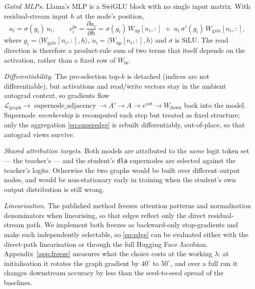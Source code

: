 \documentclass{article}
\DeclareMathOperator{\snadj}{supernode\_adjacency}
\begin{document}
\emph{Gated MLPs.} Llama's MLP is a SwiGLU block \citep{shazeer2020glu} with no single input matrix.
With residual-stream input $h$ at the node's position,
\begin{equation}
  a_i = \sigma(g_i)\, u_i, \qquad
  v^{\mathrm{in}}_i = \frac{\partial a_i}{\partial h}
    = \sigma(g_i)\, W_{\mathrm{up}}[n_i,:] \;+\; u_i\,\sigma'(g_i)\, W_{\mathrm{gate}}[n_i,:],
  \label{eq:swiglu}
\end{equation}
where $g_i = \langle W_{\mathrm{gate}}[n_i,:], h\rangle$, $u_i = \langle W_{\mathrm{up}}[n_i,:],
h\rangle$ and $\sigma$ is SiLU. The read direction is therefore a product-rule sum of two terms that
itself depends on the activation, rather than a fixed row of $W_{\mathrm{in}}$.

\emph{Differentiability.} The pre-selection top-$k$ is detached (indices are not differentiable),
but activations and read/write vectors stay in the ambient autograd context, so gradients flow
$\mathcal{L}_{\mathrm{graph}} \to \snadj \to A' \to A \to v^{\mathrm{out}} \to W_{\mathrm{down}}$
back into the model. Supernode \emph{membership} is recomputed each step but treated as fixed
structure; only the aggregation \eqref{eq:superedge} is rebuilt differentiably, out-of-place, so
that autograd views survive.

\emph{Shared attribution targets.} Both models are attributed to the \emph{same} logit token set ---
the teacher's --- and the student's \texttt{dla} supernodes are selected against the teacher's
logits. Otherwise the two graphs would be built over different output nodes, and would be
non-stationary early in training when the student's own output distribution is still wrong.

\emph{Linearisation.} The published method freezes attention patterns and normalisation
denominators when linearising, so that edges reflect only the direct residual-stream path. We
implement both freezes as backward-only stop-gradients and make each independently selectable, so
\eqref{eq:edge} can be evaluated either with the direct-path linearisation or through the full
Hugging Face Jacobian. Appendix~\ref{app:freeze} measures what the choice costs at the working
$\lambda$: at initialisation it rotates the graph gradient by $40^\circ$ to $50^\circ$, and over a
full run it changes downstream accuracy by less than the seed-to-seed spread of the baselines.
\end{document}
